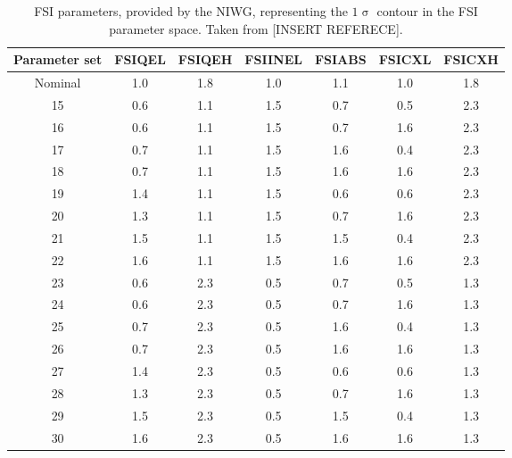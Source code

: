 \begin{table}
  \begin{tabular}{ c c c c c c c }
    Parameter set & FSIQEL & FSIQEH & FSIINEL & FSIABS & FSICXL & FSICXH \\ \hline \hline
    Nominal & 1.0 & 1.8 & 1.0 & 1.1 & 1.0 & 1.8 \\
    15 & 0.6 & 1.1 & 1.5 & 0.7 & 0.5 & 2.3 \\
    16 & 0.6 & 1.1 & 1.5 & 0.7 & 1.6 & 2.3 \\
    17 & 0.7 & 1.1 & 1.5 & 1.6 & 0.4 & 2.3 \\
    18 & 0.7 & 1.1 & 1.5 & 1.6 & 1.6 & 2.3 \\
    19 & 1.4 & 1.1 & 1.5 & 0.6 & 0.6 & 2.3 \\
    20 & 1.3 & 1.1 & 1.5 & 0.7 & 1.6 & 2.3 \\
    21 & 1.5 & 1.1 & 1.5 & 1.5 & 0.4 & 2.3 \\
    22 & 1.6 & 1.1 & 1.5 & 1.6 & 1.6 & 2.3 \\
    23 & 0.6 & 2.3 & 0.5 & 0.7 & 0.5 & 1.3 \\
    24 & 0.6 & 2.3 & 0.5 & 0.7 & 1.6 & 1.3 \\
    25 & 0.7 & 2.3 & 0.5 & 1.6 & 0.4 & 1.3 \\
    26 & 0.7 & 2.3 & 0.5 & 1.6 & 1.6 & 1.3 \\
    27 & 1.4 & 2.3 & 0.5 & 0.6 & 0.6 & 1.3 \\
    28 & 1.3 & 2.3 & 0.5 & 0.7 & 1.6 & 1.3 \\
    29 & 1.5 & 2.3 & 0.5 & 1.5 & 0.4 & 1.3 \\
    30 & 1.6 & 2.3 & 0.5 & 1.6 & 1.6 & 1.3 \\
  \end{tabular}
  \caption{FSI parameters, provided by the NIWG, representing the $1\upsigma$ contour in the FSI parameter space.  Taken from [INSERT REFERECE].}
  \label{table:FSIErrors}
\end{table}
